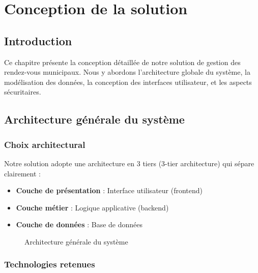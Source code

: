 \chapter{Conception de la solution}

\section{Introduction}

Ce chapitre présente la conception détaillée de notre solution de gestion des rendez-vous municipaux. Nous y abordons l'architecture globale du système, la modélisation des données, la conception des interfaces utilisateur, et les aspects sécuritaires.

\section{Architecture générale du système}

\subsection{Choix architectural}

Notre solution adopte une architecture en 3 tiers (3-tier architecture) qui sépare clairement :
\begin{itemize}
    \item \textbf{Couche de présentation} : Interface utilisateur (frontend)
    \item \textbf{Couche métier} : Logique applicative (backend)
    \item \textbf{Couche de données} : Base de données
\end{itemize}

\begin{figure}[h]
    \centering
    \caption{Architecture générale du système}
    \label{fig:system_architecture}
\end{figure}

\subsection{Technologies retenues}

